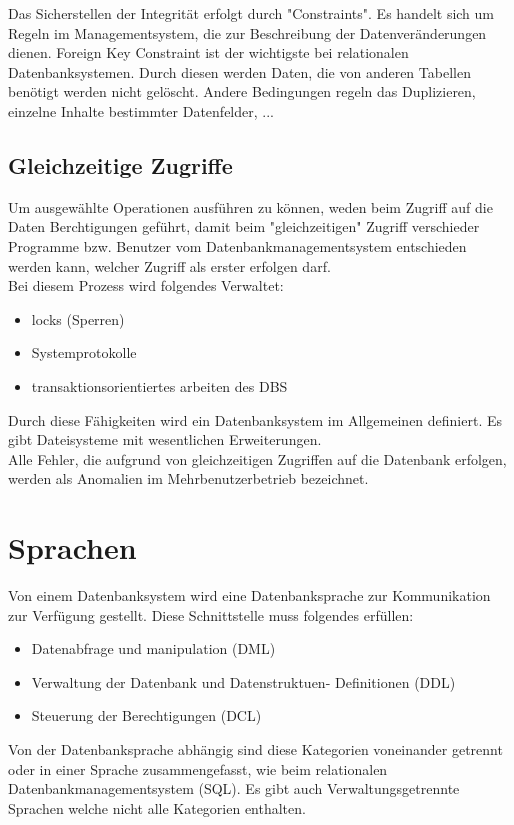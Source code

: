\documentclass[12pt,a4paper]{report}
\begin{document}
\begin{onehalfspace}
Das Sicherstellen der Integrität erfolgt durch "{}Constraints"{}. Es handelt sich um Regeln im Managementsystem, die zur Beschreibung der Datenveränderungen dienen. Foreign Key Constraint ist der wichtigste bei relationalen Datenbanksystemen. Durch diesen werden Daten, die von anderen Tabellen benötigt werden nicht gelöscht. Andere Bedingungen regeln das Duplizieren, einzelne Inhalte bestimmter Datenfelder, ...

\subsection{Gleichzeitige Zugriffe}
Um ausgewählte Operationen ausführen zu können, weden beim Zugriff auf die Daten Berchtigungen geführt, damit beim "{}gleichzeitigen"{} Zugriff verschieder Programme bzw. Benutzer vom Datenbankmanagementsystem entschieden werden kann, welcher Zugriff als erster erfolgen darf.\\
Bei diesem Prozess wird folgendes Verwaltet:
\begin{itemize}
\item locks (Sperren)
\item Systemprotokolle
\item transaktionsorientiertes arbeiten des DBS
\end{itemize}
Durch diese Fähigkeiten wird ein Datenbanksystem im Allgemeinen definiert. Es gibt Dateisysteme mit wesentlichen Erweiterungen.\\

Alle Fehler, die aufgrund von gleichzeitigen Zugriffen auf die Datenbank erfolgen, werden als Anomalien im Mehrbenutzerbetrieb bezeichnet.

\section{Sprachen}
Von einem Datenbanksystem wird eine Datenbanksprache zur Kommunikation zur Verfügung gestellt. Diese Schnittstelle muss folgendes erfüllen:
\begin{itemize}
\item Datenabfrage und manipulation (DML)
\item Verwaltung der Datenbank und Datenstruktuen- Definitionen (DDL)
\item Steuerung der Berechtigungen (DCL)
\end{itemize}
Von der Datenbanksprache abhängig sind diese Kategorien voneinander getrennt oder in einer Sprache zusammengefasst, wie beim relationalen Datenbankmanagementsystem (SQL). Es gibt auch Verwaltungsgetrennte Sprachen welche nicht alle Kategorien enthalten.

\end{onehalfspace}
\end{document}
